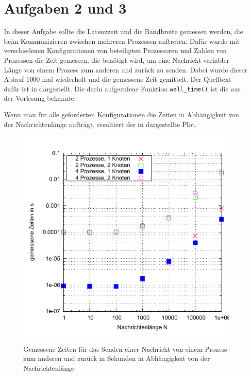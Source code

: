 \section*{Aufgaben 2 und 3}
In dieser Aufgabe sollte die Latenzzeit und die Bandbreite gemessen werden, die
beim Kommunizieren zwischen mehreren Prozessen auftreten. Dafür wurde mit verschiedenen
Konfigurationen von beteiligten Prozessoren und Zahlen von Prozessen die Zeit gemessen,
die benötigt wird, um eine Nachricht variabler Länge von einem Prozess zum anderen
und zurück zu senden. Dabei wurde dieser Ablauf $1000$ mal wiederholt und die 
gemessene Zeit gemittelt. Der Quelltext dafür ist in  dargestellt.
Die darin aufgerufene Funktion \texttt{wall_time()} ist die aus der Vorlesung bekannte.


% 

Wenn man für alle geforderten Konfigurationen die Zeiten in Abhängigkeit von der
Nachrichtenlänge aufträgt, resultiert der in  dargestellte Plot.

\begin{figure}[htb]
  \centering
  \includegraphics[width=0.8\columnwidth,keepaspectratio]{../tmp/zeiten}
  \caption{Gemessene Zeiten für das Senden einer Nachricht von einem Prozess zum
  anderen und zurück in Sekunden in Abhängigkeit von der Nachrichtenlänge}
  \label{fig:zeiten}
\end{figure}

